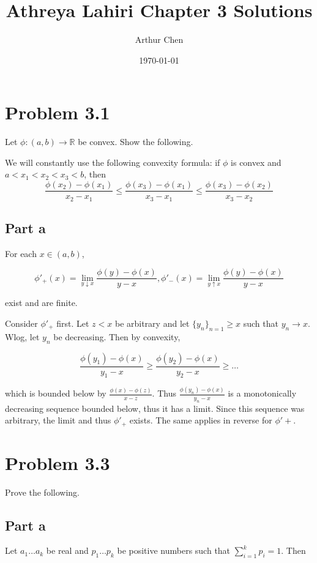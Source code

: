 \documentclass{article}
\author{Arthur Chen}
\title{Athreya Lahiri Chapter 3 Solutions}
\date{\today}
\newcommand{\R}{\mathbb{R}}
\begin{document}
\maketitle

\section*{Problem 3.1}

Let $\phi:(a, b) \rightarrow \R$ be convex. Show the following.

We will constantly use the following convexity formula: if $\phi$ is convex and $a < x_1 < x_2 < x_3 < b$, then 
\[
\frac{\phi(x_2)-\phi(x_1)}{x_2 - x_1} \leq \frac{\phi(x_3)-\phi(x_1)}{x_3 - x_1} \leq \frac{\phi(x_3)-\phi(x_2)}{x_3 - x_2}
\]

\subsection*{Part a}

For each $x \in (a, b)$,

\[
\phi'_+(x) = \lim_{y \downarrow x} \frac{\phi(y) - \phi(x)}{y-x}, \phi'_-(x) = \lim_{y \uparrow x} \frac{\phi(y) - \phi(x)}{y-x}
\]

exist and are finite.

Consider $\phi'_+$ first. Let $z < x$ be arbitrary and let $\{y_n\}_{n = 1} \geq x$ such that $y_n \rightarrow x$. Wlog, let $y_n$ be decreasing. Then by convexity,

\[
\frac{\phi(y_1) - \phi(x)}{y_1-x} \geq \frac{\phi(y_2) - \phi(x)}{y_2-x} \geq \dots
\]

which is bounded below by $\frac{\phi(x) - \phi(z)}{x-z}$. Thus $\frac{\phi(y_n) - \phi(x)}{y_n-x}$ is a monotonically decreasing sequence bounded below, thus it has a limit. Since this sequence was arbitrary, the limit and thus $\phi'_+$ exists. The same applies in reverse for $\phi'+$.

\section*{Problem 3.3}

Prove the following.

\subsection*{Part a}

Let $a_1 \dots a_k$ be real and $p_1 \dots p_k$ be positive numbers such that $\sum_{i=1}^kp_i = 1$. Then
\end{document}
